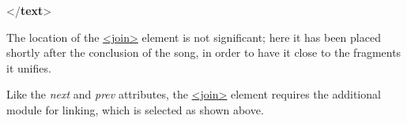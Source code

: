 \begin{shaded}
\hspace*{1em}\hspace*{1em}\hspace*{1em}\hspace*{1em}\mbox{}\newline 
\hspace*{1em}\hspace*{1em}\hspace*{1em}\mbox{}\newline 
\hspace*{1em}\hspace*{1em}\mbox{}\newline 
\hspace*{1em}\mbox{}\newline 
{}\mbox{}\newline 
{</\textbf{text}>}\end{shaded}\egroup\par \noindent  The location of the \hyperref[TEI.join]{<join>} element is not significant; here it has been placed shortly after the conclusion of the song, in order to have it close to the fragments it unifies.\par
Like the {\itshape next} and {\itshape prev} attributes, the \hyperref[TEI.join]{<join>} element requires the additional module for linking, which is selected as shown above.
